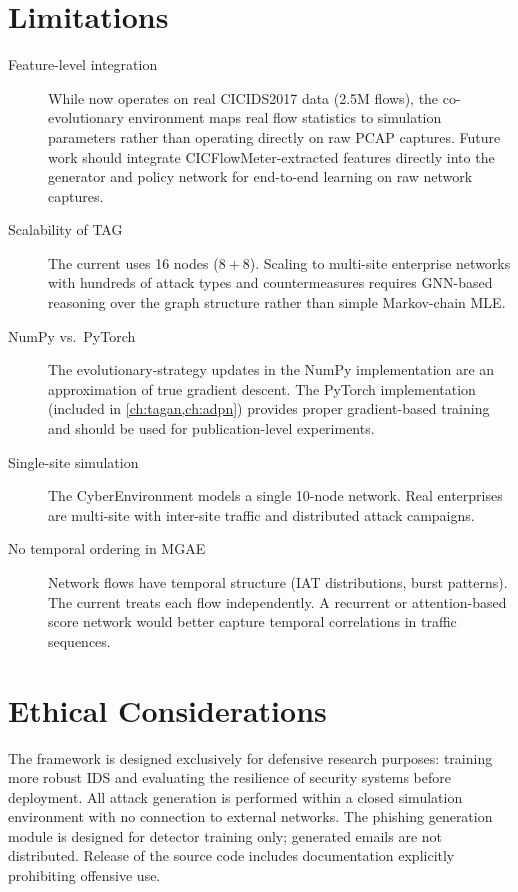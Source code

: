 \section{Limitations}

\begin{description}
  \item[Feature-level integration]
    While \caesar{} now operates on real CICIDS2017 data (2.5M flows),
    the co-evolutionary environment maps real flow statistics to simulation
    parameters rather than operating directly on raw PCAP captures.
    Future work should integrate CICFlowMeter-extracted features directly
    into the \tagan{} generator and \adpn{} policy network for
    end-to-end learning on raw network captures.

  \item[Scalability of TAG]
    The current \tagraph{} uses 16 nodes ($8 + 8$).
    Scaling to multi-site enterprise networks with hundreds of attack
    types and countermeasures requires GNN-based reasoning over the
    graph structure rather than simple Markov-chain MLE.

  \item[NumPy vs.\ PyTorch]
    The evolutionary-strategy updates in the NumPy implementation
    are an approximation of true gradient descent. The PyTorch
    implementation (included in \cref{ch:tagan,ch:adpn}) provides
    proper gradient-based training and should be used for
    publication-level experiments.

  \item[Single-site simulation]
    The CyberEnvironment models a single 10-node network.
    Real enterprises are multi-site with inter-site traffic and
    distributed attack campaigns.

  \item[No temporal ordering in MGAE]
    Network flows have temporal structure (IAT distributions, burst
    patterns). The current \mgae{} treats each flow independently.
    A recurrent or attention-based score network would better capture
    temporal correlations in traffic sequences.
\end{description}

\section{Ethical Considerations}

The \caesar{} framework is designed exclusively for defensive
research purposes: training more robust IDS and evaluating the
resilience of security systems before deployment.
All attack generation is performed within a closed simulation
environment with no connection to external networks.
The phishing generation module is designed for detector training
only; generated emails are not distributed.
Release of the source code includes documentation explicitly
prohibiting offensive use.
